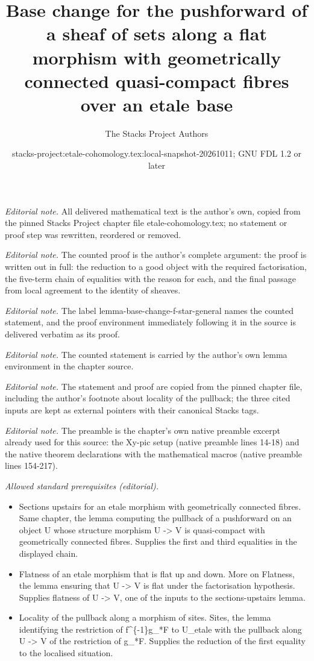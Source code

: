 \documentclass[10pt,a4paper]{amsart}
\title{Base change for the pushforward of a sheaf of sets along a flat morphism with geometrically connected quasi-compact fibres over an etale base}
\author{The Stacks Project Authors}
\date{stacks-project:etale-cohomology.tex:local-snapshot-20261011; GNU FDL 1.2 or later}
\theoremstyle{plain}
\theoremstyle{definition}
\theoremstyle{remark}
\numberwithin{equation}{subsection}
\begin{document}
\maketitle
\noindent\textit{Editorial note.} All delivered mathematical text is the author's own, copied from the pinned Stacks Project chapter file etale-cohomology.tex; no statement or proof step was rewritten, reordered or removed.\par\medskip
\noindent\textit{Editorial note.} The counted proof is the author's complete argument: the proof is written out in full: the reduction to a good object with the required factorisation, the five-term chain of equalities with the reason for each, and the final passage from local agreement to the identity of sheaves.\par\medskip
\noindent\textit{Editorial note.} The label lemma-base-change-f-star-general names the counted statement, and the proof environment immediately following it in the source is delivered verbatim as its proof.\par\medskip
\noindent\textit{Editorial note.} The counted statement is carried by the author's own lemma environment in the chapter source.\par\medskip
\noindent\textit{Editorial note.} The statement and proof are copied from the pinned chapter file, including the author's footnote about locality of the pullback; the three cited inputs are kept as external pointers with their canonical Stacks tags.\par\medskip
\noindent\textit{Editorial note.} The preamble is the chapter's own native preamble excerpt already used for this source: the Xy-pic setup (native preamble lines 14-18) and the native theorem declarations with the mathematical macros (native preamble lines 154-217).\par\medskip
\noindent\textit{Allowed standard prerequisites (editorial).}\begin{itemize}
\item Sections upstairs for an etale morphism with geometrically connected fibres. Same chapter, the lemma computing the pullback of a pushforward on an object U whose structure morphism U -> V is quasi-compact with geometrically connected fibres. Supplies the first and third equalities in the displayed chain.
\item Flatness of an etale morphism that is flat up and down. More on Flatness, the lemma ensuring that U -> V is flat under the factorisation hypothesis. Supplies flatness of U -> V, one of the inputs to the sections-upstairs lemma.
\item Locality of the pullback along a morphism of sites. Sites, the lemma identifying the restriction of f\textasciicircum{}\{-1\}g\_*F to U\_etale with the pullback along U -> V of the restriction of g\_*F. Supplies the reduction of the first equality to the localised situation.
\end{itemize}\medskip
\end{document}
